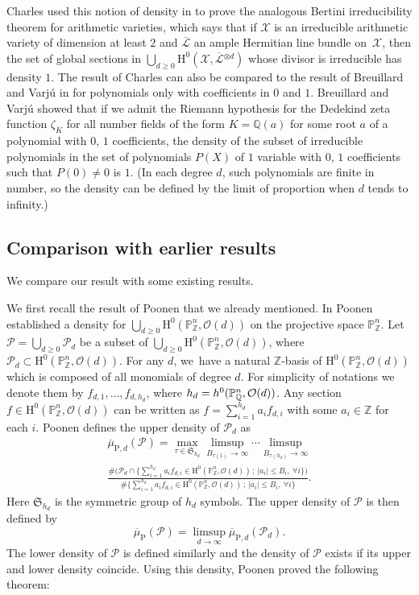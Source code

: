 \documentclass[11pt]{article}
\numberwithin{equation}{section}
\newcommand{\sep}{\,;\,}
\theoremstyle{plain}
\theoremstyle{definition}
\newcommand{\ho}{\mathrm{H}}
\newcommand{\X}{\mathcal{X}}
\newcommand{\Li}{\overline{\mathcal{L}}{}}
\newcommand{\Q}{\mathbb{Q}}
\newcommand{\Z}{\mathbb{Z}}
\newcommand{\pr}{\mathbb{P}}
\begin{document}
Charles used this notion of density in \cite{Ch17} to prove the analogous Bertini irreducibility theorem for arithmetic varieties, which says that if $\X$ is an irreducible arithmetic variety of dimension at least $2$ and $\Li$ an ample Hermitian line bundle on~$\X$, then the set of global sections in $\bigcup_{d\geq 0}\ho^0(\X, \Li^{\otimes d})$ whose divisor is irreducible has density $1$.
The result of Charles can also be compared to the result of Breuillard and Varjú in \cite{BV19} for polynomials only with coefficients in $0$ and $1$. Breuillard and Varjú showed that if we admit the Riemann hypothesis for the Dedekind zeta function $\zeta_K$ for all number fields of the form $K=\Q(a)$ for some root $a$ of a polynomial with $0$, $1$ coefficients, the density of the subset of irreducible polynomials in the set of polynomials $P(X)$ of $1$ variable with $0$, $1$ coefficients such that $P(0)\not=0$ is $1$. (In each degree $d$, such polynomials are finite in number, so the density can be defined by the limit of proportion when $d$ tends to infinity.) 

\subsection{Comparison with earlier results}
We compare our result with some existing results.

We first recall the result of Poonen that we already mentioned. In \cite{Po04} Poonen established a density for $\bigcup_{d\geq 0}\ho^0(\pr^n_{\Z}, \mathcal{O}(d))$ on the projective space $\pr^n_{\Z}$. Let $\mathcal{P}=\bigcup_{d\geq 0}\mathcal{P}_d$ be a subset of $\bigcup_{d\geq 0}\ho^0(\pr^n_{\Z}, \mathcal{O}(d))$, where $\mathcal{P}_d\subset \ho^0(\pr^n_{\Z}, \mathcal{O}(d))$. For any $d$, we~have a natural $\Z$-basis of $\ho^0(\pr^n_{\Z}, \mathcal{O}(d))$ which is composed of all monomials of degree $d$. For simplicity of notations we denote them by $f_{d,1},\dots, f_{d,h_d}$, where $h_d=\nobreak h^0(\pr^n_{\Q}, \mathcal{O}(d))$. Any section $f\in \ho^0(\pr^n_{\Z}, \mathcal{O}(d))$ can be written as $f=\sum_{i=1}^{h_d}a_if_{d,i}$ with some $a_i\in \Z$ for each $i$. Poonen defines the upper density of $\mathcal{P}_d$ as
\begin{multline*}
\overline{\mu}_{\mathrm{P},d}(\mathcal{P})=\max_{\tau\in \mathfrak{S}_{h_d}}\limsup_{B_{\tau(1)}\to \infty}\cdots \limsup_{B_{\tau(h_d)}\to \infty}\\
\frac{\#\bigl(\mathcal{P}_d\cap \{ \sum_{i=1}^{h_d}a_if_{d,i}\in \ho^0(\pr^n_{\Z}, \mathcal{O}(d))\sep |a_i|\leq B_i,\ \forall i \}\bigr)}{\#\{ \sum_{i=1}^{h_d}a_if_{d,i}\in \ho^0(\pr^n_{\Z}, \mathcal{O}(d))\sep |a_i|\leq B_i,\ \forall i \}}.
\end{multline*}
Here $\mathfrak{S}_{h_d}$ is the symmetric group of $h_d$ symbols. The upper density of $\mathcal{P}$ is then defined by
\[
\overline{\mu}_{\mathrm{P}}(\mathcal{P})=\limsup_{d\to \infty} \overline{\mu}_{\mathrm{P},d}(\mathcal{P}_d).
\]
The lower density of $\mathcal{P}$ is defined similarly and the density of $\mathcal{P}$ exists if its upper and lower density coincide. Using this density, Poonen proved the following theorem:
\end{document}
